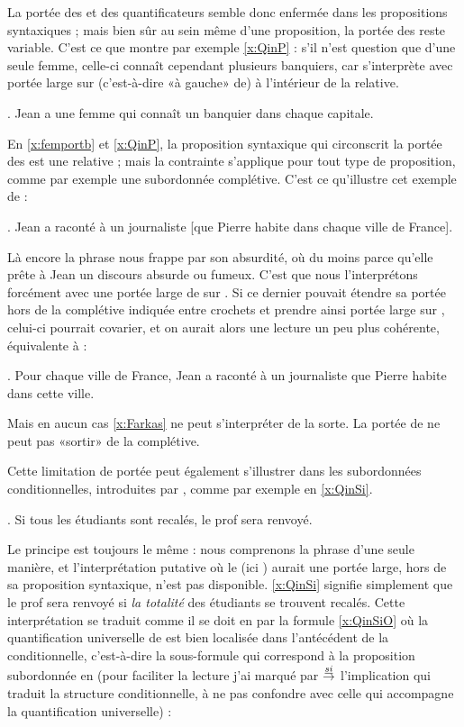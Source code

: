 La portée des {\GN} et des quantificateurs semble donc enfermée dans
les propositions syntaxiques ; mais bien sûr au sein même d'une
proposition, la portée des {\GN} reste variable.  C'est ce que montre
par exemple \ref{x:QinP} : s'il n'est question que d'une seule femme,
celle-ci connaît cependant plusieurs banquiers, car  s'interprète avec 
portée large sur (c'est-à-dire «à gauche» de) 
à l'intérieur de la relative.


\ex. \label{x:QinP}
 Jean a une femme qui connaît un banquier dans chaque capitale.


En \ref{x:femportb} et \ref{x:QinP}, la proposition syntaxique qui
circonscrit la portée des {\GN} est une relative ; mais la
contrainte s'applique pour tout type de proposition, comme par exemple
une subordonnée complétive.  C'est ce qu'illustre cet exemple de 
\citet{Farkas:81} :

\ex. 
\juge{\urgh} Jean a raconté à un journaliste [que Pierre habite dans chaque ville de
France]. \label{x:Farkas}

Là encore la phrase nous frappe par son absurdité, où du moins parce
qu'elle prête à Jean un discours absurde ou fumeux.  C'est  que
nous l'interprétons forcément avec une portée large de  sur .  
Si ce dernier {\GN} pouvait étendre sa portée hors de la complétive
indiquée entre crochets et prendre ainsi portée  large sur , celui-ci pourrait  covarier, et on aurait alors une
lecture un peu plus cohérente,  équivalente à :

\ex.  Pour chaque ville de France, Jean a raconté à un journaliste que
Pierre habite dans cette ville. 

Mais en aucun cas \ref{x:Farkas} ne peut s'interpréter de la sorte.
La portée de  ne peut pas «sortir»
de la complétive. 

Cette limitation de portée peut également s'illustrer dans les
subordonnées conditionnelles, introduites par , comme  par
exemple en \ref{x:QinSi}.



\ex. \label{x:QinSi}
Si tous les étudiants sont recalés, le prof sera renvoyé.


Le principe est toujours le même : nous comprenons la phrase d'une
seule manière, et l'interprétation putative où le {\GN} (ici
) aurait une portée large, hors de sa
proposition syntaxique, n'est pas disponible.  \ref{x:QinSi} signifie
simplement que le prof sera renvoyé si \emph{la totalité} des
étudiants se trouvent recalés.  Cette interprétation se traduit comme
il se doit en {\LO} par la formule \ref{x:QinSiO} où la quantification
universelle de  est bien localisée dans
l'antécédent de la conditionnelle, c'est-à-dire la sous-formule qui
correspond à la proposition subordonnée en  (pour faciliter la
lecture j'ai marqué par $\stackrel{\emph{si}}{\rightarrow}$ l'implication
qui traduit la structure conditionnelle, à ne pas confondre avec
celle qui accompagne la quantification universelle) :

